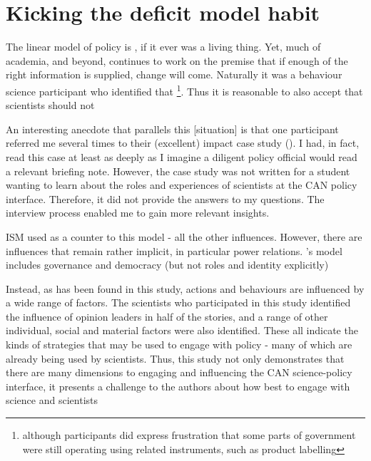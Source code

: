 \section{Kicking the deficit model habit}\label{sec:disdeficit}
The linear model of policy is , if it ever was a living thing. Yet, much of academia, and beyond, continues to work on the premise that if enough of the right information is supplied, change will come. Naturally it was a behaviour science participant who identified that \footnote{although participants did express frustration that some parts of government were still operating using related instruments, such as product labelling}. Thus it is reasonable to also accept that scientists should not 

An interesting anecdote that parallels this [situation] is that one participant referred me several times to their (excellent) impact case study (). I had, in fact, read this case at least as deeply as I imagine a diligent policy official would read a relevant briefing note. However, the case study was not written for a student wanting to learn about the roles and experiences of scientists at the CAN policy interface. Therefore, it did not provide the answers to my questions. The interview process enabled me to gain more relevant insights.

ISM used as a counter to this model - all the other influences. However, there are influences that remain rather implicit, in particular power relations. \cite{HamptonW2023}'s model includes governance and democracy (but not roles and identity explicitly)

Instead, as has been found in this study, actions and behaviours are influenced by a wide range of factors. The scientists who participated in this study identified the influence of opinion leaders in half of the stories, and a range of other individual, social and material factors were also identified. These all indicate the kinds of strategies that may be used to engage with policy - many of which are already being used by scientists. Thus, this study not only demonstrates that there are many dimensions to engaging and influencing the CAN science-policy interface, it presents a challenge to the authors about how best to engage with science and scientists


